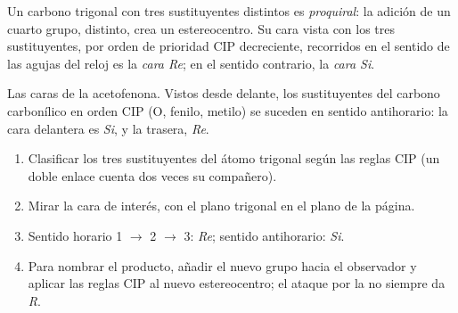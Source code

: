 \begin{definition}\label{def:b3:asymmetric-synthesis:faces}
Un carbono trigonal con tres sustituyentes distintos es \emph{proquiral}:
la adición de un cuarto grupo, distinto, crea un estereocentro. Su cara vista con
los tres sustituyentes, por orden de prioridad CIP decreciente, recorridos en el sentido de las agujas del reloj es la
\emph{cara Re}; en el sentido contrario, la \emph{cara Si}.
\end{definition}

\begin{omfigure}

{\small Las caras de la acetofenona. Vistos desde delante, los sustituyentes del
carbono carbonílico en orden CIP (O, fenilo, metilo) se suceden en sentido antihorario: la cara
delantera es \textit{Si}, y la trasera, \textit{Re}.}
\end{omfigure}

\begin{method}\label{met:b3:asymmetric-synthesis:re-si}
\begin{enumerate}
  \item Clasificar los tres sustituyentes del átomo trigonal según las reglas CIP (un
        doble enlace cuenta dos veces su compañero).
  \item Mirar la cara de interés, con el plano trigonal en el plano de la página.
  \item Sentido horario 1 $\to$ 2 $\to$ 3: \textit{Re}; sentido antihorario: \textit{Si}.
  \item Para nombrar el producto, añadir el nuevo grupo hacia el observador y aplicar las
        reglas CIP al nuevo estereocentro; el ataque por la  no siempre da \textit{R}.
\end{enumerate}
\end{method}

